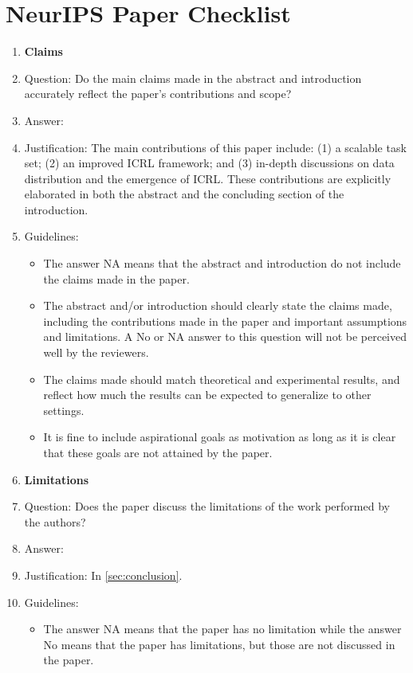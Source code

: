 \documentclass{article}
\begin{document}
\section*{NeurIPS Paper Checklist}
\begin{enumerate}
\item {\bf Claims}
    \item[] Question: Do the main claims made in the abstract and introduction accurately reflect the paper's contributions and scope?
    \item[] Answer: \answerYes{}
    \item[] Justification: The main contributions of this paper include: (1) a scalable task set; (2) an improved ICRL framework; and (3) in-depth discussions on data distribution and the emergence of ICRL. These contributions are explicitly elaborated in both the abstract and the concluding section of the introduction.
    \item[] Guidelines:
    \begin{itemize}
        \item The answer NA means that the abstract and introduction do not include the claims made in the paper.
        \item The abstract and/or introduction should clearly state the claims made, including the contributions made in the paper and important assumptions and limitations. A No or NA answer to this question will not be perceived well by the reviewers.
        \item The claims made should match theoretical and experimental results, and reflect how much the results can be expected to generalize to other settings.
        \item It is fine to include aspirational goals as motivation as long as it is clear that these goals are not attained by the paper.
    \end{itemize}
\item {\bf Limitations}
    \item[] Question: Does the paper discuss the limitations of the work performed by the authors?
    \item[] Answer: \answerYes{}
    \item[] Justification: In \cref{sec:conclusion}.
    \item[] Guidelines:
    \begin{itemize}
        \item The answer NA means that the paper has no limitation while the answer No means that the paper has limitations, but those are not discussed in the paper.

\end{itemize}
\end{enumerate}
\end{document}
